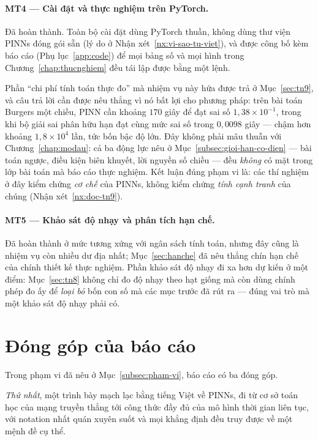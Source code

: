 \paragraph{MT4 --- Cài đặt và thực nghiệm trên PyTorch.}
Đã hoàn thành. Toàn bộ cài đặt dùng PyTorch thuần, không dùng thư viện PINNs đóng
gói sẵn (lý do ở Nhận xét~\ref{nx:vi-sao-tu-viet}), và được công bố kèm báo cáo
(Phụ lục~\ref{app:code}) để mọi bảng số và mọi hình trong
Chương~\ref{chap:thucnghiem} đều tái lập được bằng một lệnh.

Phần ``chi phí tính toán thực đo'' mà nhiệm vụ này hứa được trả ở
Mục~\ref{sec:tn9}, và câu trả lời cần được nêu thẳng vì nó bất lợi cho phương
pháp: trên bài toán Burgers một chiều, PINN cần khoảng $170$ giây để đạt sai số
$1{,}38\times10^{-1}$, trong khi bộ giải sai phân hữu hạn đạt cùng mức sai số
trong $0{,}0098$ giây --- chậm hơn khoảng $1{,}8\times10^{4}$ lần, tức bốn bậc độ
lớn. Đây không phải mâu thuẫn với Chương~\ref{chap:modau}: cả ba động lực
nêu ở Mục~\ref{subsec:gioi-han-co-dien} --- bài toán ngược, điều kiện biên
khuyết, lời nguyền số chiều --- đều \emph{không} có mặt trong lớp bài toán mà
báo cáo thực nghiệm. Kết luận đúng phạm vi là: các thí nghiệm ở đây kiểm chứng
\emph{cơ chế} của PINNs, không kiểm chứng \emph{tính cạnh tranh} của chúng
(Nhận xét~\ref{nx:doc-tn9}).

\paragraph{MT5 --- Khảo sát độ nhạy và phân tích hạn chế.}
Đã hoàn thành ở mức tương xứng với ngân sách tính toán, nhưng đây cũng là nhiệm
vụ còn nhiều dư địa nhất; Mục~\ref{sec:hanche} đã nêu thẳng chín hạn chế của chính
thiết kế thực nghiệm. Phần khảo sát độ nhạy đi xa hơn dự kiến ở một điểm:
Mục~\ref{sec:tn8} không chỉ đo độ nhạy theo hạt giống mà còn dùng chính phép đo
ấy để \emph{loại bỏ} bốn con số mà các mục trước đã rút ra --- đúng vai trò mà
một khảo sát độ nhạy phải có.

\section{Đóng góp của báo cáo}
\label{sec:dong-gop-cuoi}

Trong phạm vi đã nêu ở Mục~\ref{subsec:pham-vi}, báo cáo có ba đóng góp.

\emph{Thứ nhất}, một trình bày mạch lạc bằng tiếng Việt về PINNs, đi từ cơ sở
toán học của mạng truyền thẳng tới công thức đầy đủ của mô hình thời gian liên
tục, với notation nhất quán xuyên suốt và mọi khẳng định đều truy được về một
mệnh đề cụ thể.

